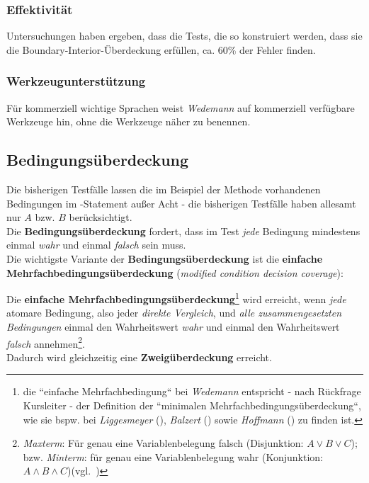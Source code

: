 \subsubsection*{Effektivität}
Untersuchungen haben ergeben, dass die Tests, die so konstruiert werden, dass sie die Boundary-Interior-Überdeckung erfüllen, ca. 60\% der Fehler finden.

\subsubsection*{Werkzeugunterstützung}
Für kommerziell wichtige Sprachen weist \textit{Wedemann} auf kommerziell verfügbare Werkzeuge hin, ohne die Werkzeuge näher zu benennen.

\subsection{Bedingungsüberdeckung}
Die bisherigen Testfälle lassen die im Beispiel der Methode  vorhandenen Bedingungen im -Statement außer Acht - die bisherigen Testfälle haben allesamt nur $A$ bzw. $B$ berücksichtigt.\\
Die \textbf{Bedingungsüberdeckung} fordert, dass im Test \textit{jede} Bedingung mindestens einmal \textit{wahr} und einmal \textit{falsch} sein muss.\\
Die wichtigste Variante der \textbf{Bedingungsüberdeckung} ist die \textbf{einfache Mehrfachbedingungsüberdeckung} (\textit{modified condition decision coverage}):

\begin{tcolorbox}[title=Einfache Mehrfachbedingungsüberdeckung]
Die \textbf{einfache Mehrfachbedingungsüberdeckung}\footnote{
die ``einfache Mehrfachbedingung`` bei \textit{Wedemann} entspricht - nach Rückfrage Kursleiter - der Definition der ``minimalen Mehrfachbedingungsüberdeckung``, wie sie bspw. bei \textit{Liggesmeyer} (\cite[101 ff.]{Lig09a}), \textit{Balzert} (\cite[411 f.]{Bal97}) sowie \textit{Hoffmann} (\cite[215]{Hof13}) zu finden ist.
} wird erreicht, wenn \textit{jede} atomare Bedingung, also jeder \textit{direkte Vergleich}, und \textit{alle zusammengesetzten Bedingungen} einmal den Wahrheitswert \textit{wahr} und einmal den Wahrheitswert \textit{falsch} annehmen\footnote{
    \textit{Maxterm}: Für genau eine Variablenbelegung falsch (Disjunktion: $A \lor B \lor C$); bzw. \textit{Minterm}: für genau eine Variablenbelegung wahr (Konjunktion: $A \land B \land C$)(vgl.~\cite[92]{Hof22})
}.\\
    Dadurch wird gleichzeitig eine \textbf{Zweigüberdeckung} erreicht.
\end{tcolorbox}


